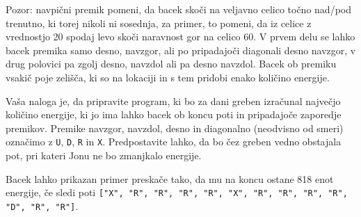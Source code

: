 \documentclass[arhiv]{../izpit}
\begin{document}
Pozor: navpični premik pomeni, da bacek skoči na veljavno celico točno nad/pod trenutno, ki torej nikoli ni sosednja, za primer, to pomeni, da iz celice z vrednostjo 20 spodaj levo skoči naravnost gor na celico 60. 
V prvem delu se lahko bacek 
premika samo desno, navzgor, ali po pripadajoči 
diagonali desno navzgor, v drug polovici pa zgolj desno, navzdol
ali pa desno navzdol. 
Bacek ob premiku vsakič poje zelišča, ki so 
na lokaciji in s tem pridobi enako količino energije.

Vaša naloga je, da pripravite program, ki bo za dani greben
izračunal največjo količino energije, ki jo ima lahko bacek 
ob koncu poti in pripadajoče zaporedje premikov. Premike navzgor, navzdol, desno in diagonalno (neodvisno od smeri) označimo z \verb|U|, \verb|D|, \verb|R| in \verb|X|.
Predpostavite lahko, da bo čez greben vedno obstajala pot, pri kateri Jonu ne bo zmanjkalo energije.

Bacek lahko prikazan primer preskače tako, da mu na koncu ostane 818 enot energije, če sledi poti \verb|["X", "R", "R", "R", "R", "X", "R", "R", "R", "R", "D", "R", "R"]|.
\end{document}
